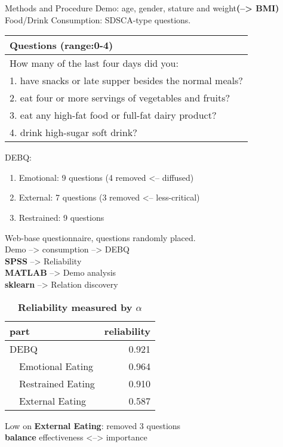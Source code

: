 \documentclass[final]{beamer}
\newlength{\onecolwid}
\newlength{\twocolwid}
\begin{document}
\begin{frame}[t]
\begin{columns}[t]
\begin{column}{\twocolwid}
\begin{columns}[t,totalwidth=\twocolwid]
\begin{column}{\onecolwid}
\begin{block}{Methods and Procedure}
Demo: age, gender, stature and weight\textbf{(--> BMI)} \\
\bigskip
Food/Drink Consumption: SDSCA-type questions.
\begin{table}[htbp]
    \centering
    \begin{tabular}{l}
        \toprule
        Questions (range:0-4) \\
        \midrule
        How many of the last four days did you: \\
        1. have snacks or late supper besides the normal meals? \\
        2. eat four or more servings of vegetables and fruits? \\
        3. eat any high-fat food or full-fat dairy product? \\
        4. drink high-sugar soft drink? \\
        \bottomrule
    \end{tabular}
\end{table}
\bigskip
DEBQ: 
\begin{enumerate}
	\item Emotional: 9 questions (4 removed <-- diffused)
	\item External: 7 questions (3 removed <-- less-critical)
	\item Restrained: 9 questions 
\end{enumerate}
\bigskip
Web-base questionnaire, questions randomly placed. \\
Demo --> consumption --> DEBQ \\
\bigskip
\textbf{SPSS} --> Reliability \\
\textbf{MATLAB} --> Demo analysis \\
\textbf{sklearn} --> Relation discovery \\
\begin{table}[htbp]
    \caption{\textbf{Reliability measured by \(\alpha\)}}
    \centering
    \begin{tabular}{lr}
        \toprule
        part & reliability \\
        \midrule
        DEBQ & 0.921 \\
        ~~Emotional Eating & 0.964 \\
        ~~Restrained Eating & 0.910 \\
        ~~External Eating & 0.587 \\
        \bottomrule
    \end{tabular}
\end{table}
Low on \textbf{External Eating}: removed 3 questions
\\ \textbf{balance} effectiveness <--> importance 


\end{block}
\end{column}
\end{columns}
\end{column}
\end{columns}
\end{frame}
\end{document}
